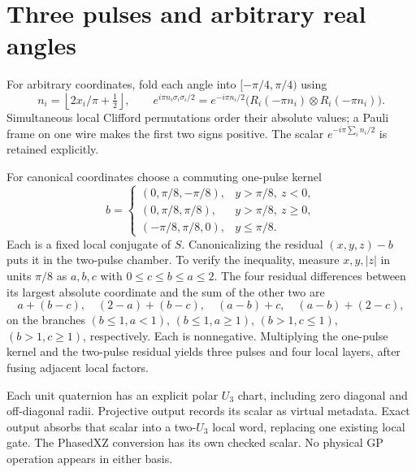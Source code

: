 \documentclass[11pt]{article}
\begin{document}
\section{Three pulses and arbitrary real angles}
For arbitrary coordinates, fold each angle into $[-\pi/4,\pi/4)$ using
\[
 n_i=\left\lfloor2x_i/\pi+\tfrac12\right\rfloor,\qquad
 e^{i\pi n_i\sigma_i\sigma_i/2}
 =e^{-i\pi n_i/2}\bigl(R_i(-\pi n_i)\otimes R_i(-\pi n_i)\bigr).
\]
Simultaneous local Clifford permutations order their absolute values;
a Pauli frame on one wire makes the first two signs positive.
The scalar $e^{-i\pi\sum_i n_i/2}$ is retained explicitly.

For canonical coordinates choose a commuting one-pulse kernel
\[
 b=\begin{cases}
 (0,\pi/8,-\pi/8),&y>\pi/8,\ z<0,\\
 (0,\pi/8,\pi/8),&y>\pi/8,\ z\geq0,\\
 (-\pi/8,\pi/8,0),&y\leq\pi/8.
 \end{cases}
\]
Each is a fixed local conjugate of $S$. Canonicalizing the residual
$(x,y,z)-b$ puts it in the two-pulse chamber. To verify the inequality,
measure $x,y,|z|$ in units $\pi/8$ as $a,b,c$ with
$0\leq c\leq b\leq a\leq2$. The four residual differences between its
largest absolute coordinate and the sum of the other two are
\[
 a+(b-c),\quad (2-a)+(b-c),\quad (a-b)+c,\quad (a-b)+(2-c),
\]
on the branches $(b\leq1,a<1)$, $(b\leq1,a\geq1)$,
$(b>1,c\leq1)$, $(b>1,c\geq1)$, respectively. Each is nonnegative.
Multiplying the one-pulse kernel and the two-pulse residual yields three
pulses and four local layers, after fusing adjacent local factors.

Each unit quaternion has an explicit polar $U_3$ chart, including zero
diagonal and off-diagonal radii. Projective output records its scalar as
virtual metadata. Exact output absorbs that scalar into a two-$U_3$ local
word, replacing one existing local gate. The PhasedXZ conversion has its
own checked scalar. No physical GP operation appears in either basis.
\end{document}
